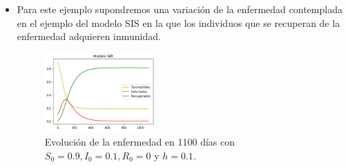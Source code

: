 \begin{itemize}
    \item Para este ejemplo supondremos una variación de la enfermedad contemplada en el ejemplo del modelo SIS en la que los individuos que se recuperan de la enfermedad adquieren inmunidad.
    
    \begin{figure}[h]
      \centering
        \includegraphics[width=0.4\textwidth]{Imagenes/ex1SIR.PNG}
      \caption{\centering Evolución de la enfermedad en 1100 días con $S_0=0.9,I_0=0.1,R_0=0$ y $h=0.1$.}
      \label{fig:Ejemplo 1 - SIR}
    \end{figure}
\end{itemize}

